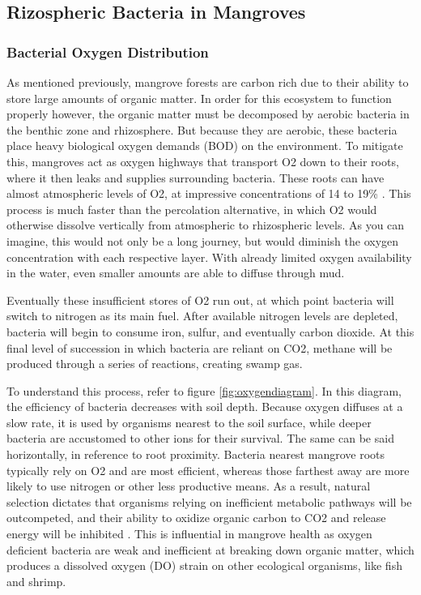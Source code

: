 \subsection{Rizospheric Bacteria in Mangroves}

\subsubsection{Bacterial Oxygen Distribution}

  As mentioned previously, mangrove forests are carbon rich due to their ability to store large amounts of organic matter. In order for this ecosystem to function properly however, the organic matter must be decomposed by aerobic bacteria in the benthic zone and rhizosphere. But because they are aerobic, these bacteria place heavy biological oxygen demands (BOD) on the environment. To mitigate this, mangroves act as oxygen highways that transport O2 down to their roots, where it then leaks and supplies surrounding bacteria. These roots can have almost atmospheric levels of O2, at impressive concentrations of 14 to 19\% \citep{scholander1955micro}. This process is much faster than the percolation alternative, in which O2 would otherwise dissolve vertically from atmospheric to rhizospheric levels. As you can imagine, this would not only be a long journey, but would diminish the oxygen concentration with each respective layer. With already limited oxygen availability in the water, even smaller amounts are able to diffuse through mud. %
  
  Eventually these insufficient stores of O2 run out, at which point bacteria will switch to nitrogen as its main fuel. After available nitrogen levels are depleted, bacteria will begin to consume iron, sulfur, and eventually carbon dioxide. At this final level of succession in which bacteria are reliant on CO2, methane will be produced through a series of reactions, creating swamp gas. 
  
  To understand this process, refer to figure \ref{fig:oxygendiagram}. In this diagram, the efficiency of bacteria decreases with soil depth. Because oxygen diffuses at a slow rate, it is used by organisms nearest to the soil surface, while deeper bacteria are accustomed to other ions for their survival. The same can be said horizontally, in reference to root proximity. Bacteria nearest mangrove roots typically rely on O2 and are most efficient, whereas those farthest away are more likely to use nitrogen or other less productive means. As a result, natural selection dictates that organisms relying on inefficient metabolic pathways will be outcompeted, and their ability to oxidize organic carbon to CO2 and release energy will be inhibited \citep{dodds2002freshwater}. This is influential in mangrove health as oxygen deficient bacteria are weak and inefficient at breaking down organic matter, which produces a dissolved oxygen (DO) strain on other ecological organisms, like fish and shrimp. 
  
